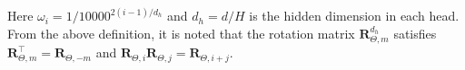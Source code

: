 \documentclass{article} \usepackage{iclr2025_conference,times}
\begin{document}
Here $\omega_i=1/\textrm{10000}^{2(i-1)/d_h}$ and $d_h=d/H$ is the hidden dimension in each head. From the above definition, it is noted that the rotation matrix $\boldsymbol{R}_{\Theta,m}^{d_h}$ satisfies $\boldsymbol{R}_{\Theta,m}^\top=\boldsymbol{R}_{\Theta,-m}$ and $\boldsymbol{R}_{\Theta,i}\boldsymbol{R}_{\Theta,j}=\boldsymbol{R}_{\Theta,i+j}$.
\end{document}
